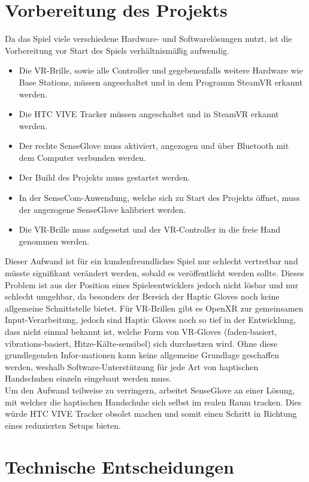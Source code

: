 \section{Vorbereitung des Projekts}
Da das Spiel viele verschiedene Hardware- und Softwarelösungen nutzt, ist die Vorbereitung vor Start des Spiels verhältnismäßig aufwendig.

\begin{itemize}
	\item Die VR-Brille, sowie alle Controller und gegebenenfalls weitere Hardware wie \dq Base Stations\dq, müssen angeschaltet und in dem Programm SteamVR erkannt werden.
	\item Die HTC VIVE Tracker müssen angeschaltet und in SteamVR erkannt werden.
	\item Der rechte SenseGlove muss aktiviert, angezogen und über Bluetooth mit dem Computer verbunden werden.
	\item Der Build des Projekts muss gestartet werden.
	\item In der SenseCom-Anwendung, welche sich zu Start des Projekts öffnet, muss der angezogene SenseGlove kalibriert werden.
	\item Die VR-Brille muss aufgesetzt und der VR-Controller in die freie Hand genommen werden.
\end{itemize}
\noindent Dieser Aufwand ist für ein kundenfreundliches Spiel nur schlecht vertretbar und müsste signifikant verändert werden, sobald es veröffentlicht werden sollte. Dieses Problem ist aus der Position eines Spieleentwicklers jedoch nicht lösbar und nur schlecht umgehbar, da besonders der Bereich der Haptic Gloves noch keine allgemeine Schnittstelle bietet. Für VR-Brillen gibt es OpenXR zur gemeinsamen Input-Verarbeitung, jedoch sind Haptic Gloves noch so tief in der Entwicklung, dass nicht einmal bekannt ist, welche Form von VR-Gloves (faden-basiert, vibrations-basiert, Hitze-Kälte-sensibel) sich durchsetzen wird. Ohne diese grundlegenden Infor-mationen kann keine allgemeine Grundlage geschaffen werden, weshalb Software-Unterstützung für jede Art von haptischen Handschuhen einzeln eingebaut werden muss.\\
\noindent Um den Aufwand teilweise zu verringern, arbeitet SenseGlove an einer Lösung, mit welcher die haptischen Handschuhe sich selbst im realen Raum tracken. Dies würde HTC VIVE Tracker obsolet machen und somit einen Schritt in Richtung eines reduzierten Setups bieten.



\section{Technische Entscheidungen}

